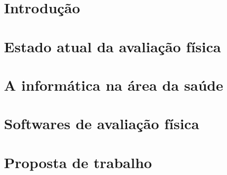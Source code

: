 \documentclass[a4paper,12pt]{abnt}
\begin{document}

    \capa

    \folhaderosto

    \tableofcontents

    \chapter*{Introdução}

    \chapter{Estado atual da avaliação física}

    \chapter{A informática na área da saúde}

    \chapter{Softwares de avaliação física}

    \chapter{Proposta de trabalho}
\end{document}
